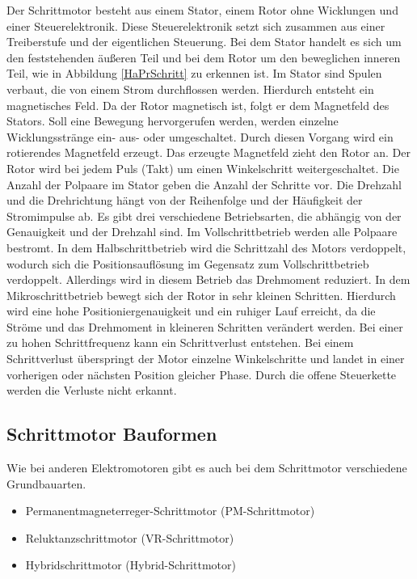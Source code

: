 Der Schrittmotor besteht aus einem Stator, einem Rotor ohne Wicklungen und einer Steuerelektronik. Diese Steuerelektronik setzt sich zusammen aus einer Treiberstufe und der eigentlichen Steuerung. Bei dem Stator handelt es sich um den feststehenden äußeren Teil und bei dem Rotor um den beweglichen inneren Teil, wie in Abbildung \ref{HaPrSchritt} zu erkennen ist. Im Stator sind Spulen verbaut, die von einem Strom durchflossen werden. Hierdurch entsteht ein magnetisches Feld. Da der Rotor magnetisch ist, folgt er dem Magnetfeld des Stators. Soll eine Bewegung hervorgerufen werden, werden einzelne Wicklungsstränge ein- aus- oder umgeschaltet. Durch diesen Vorgang wird ein rotierendes Magnetfeld erzeugt. Das erzeugte Magnetfeld zieht den Rotor an. Der Rotor wird bei jedem Puls (Takt) um einen Winkelschritt weitergeschaltet. Die Anzahl der Polpaare im Stator geben die Anzahl der Schritte vor. Die Drehzahl und die Drehrichtung hängt von der Reihenfolge und der Häufigkeit der Stromimpulse ab. Es gibt drei verschiedene Betriebsarten, die abhängig von der Genauigkeit und der Drehzahl sind. Im Vollschrittbetrieb werden alle Polpaare bestromt. In dem Halbschrittbetrieb wird die Schrittzahl des Motors verdoppelt, wodurch sich die Positionsauflösung im Gegensatz zum Vollschrittbetrieb verdoppelt. Allerdings wird in diesem Betrieb das Drehmoment reduziert. In dem Mikroschrittbetrieb bewegt sich der Rotor in sehr kleinen Schritten. Hierdurch wird eine hohe Positioniergenauigkeit und ein ruhiger Lauf erreicht, da die Ströme und das Drehmoment in kleineren Schritten verändert werden. Bei einer zu hohen Schrittfrequenz kann ein Schrittverlust entstehen. Bei einem Schrittverlust überspringt der Motor einzelne Winkelschritte und landet in einer vorherigen oder nächsten Position gleicher Phase. Durch die offene Steuerkette werden die Verluste nicht erkannt.\cite{Hagl:2021,Bernstein:2018,Schroeder:2021}




\subsection{Schrittmotor Bauformen}

Wie bei anderen Elektromotoren gibt es auch bei dem Schrittmotor verschiedene Grundbauarten. 

\begin{itemize}
	\item {Permanentmagneterreger-Schrittmotor (PM-Schrittmotor)}
	\item {Reluktanzschrittmotor (VR-Schrittmotor)}
	\item {Hybridschrittmotor (Hybrid-Schrittmotor)}
\end{itemize}

